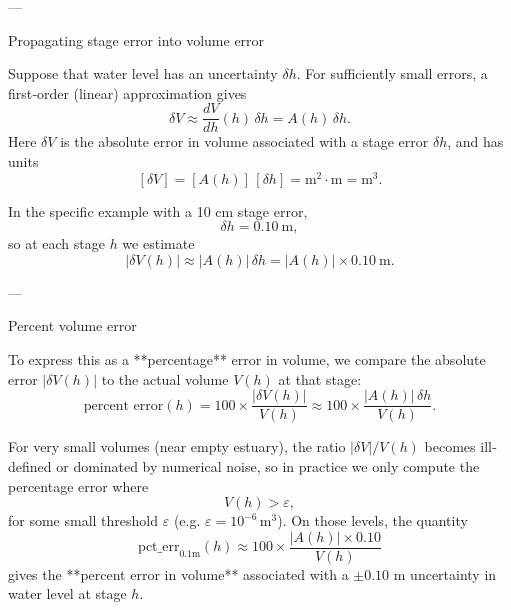 \documentclass[preprint,12pt,authoryear]{elsarticle}
\begin{document}
---

 Propagating stage error into volume error

Suppose that water level has an uncertainty \(\delta h\). For sufficiently small
errors, a first‐order (linear) approximation gives
\[
\delta V \approx \frac{dV}{dh}(h)\,\delta h = A(h)\,\delta h.
\]
Here \(\delta V\) is the absolute error in volume associated with a stage error
\(\delta h\), and has units
\[
[\delta V] = [A(h)]\,[\delta h]
           = \text{m}^2 \cdot \text{m}
           = \text{m}^3.
\]

In the specific example with a 10 cm stage error,
\[
\delta h = 0.10~\text{m},
\]
so at each stage \(h\) we estimate
\[
|\delta V(h)| \approx |A(h)| \,\delta h
                  = |A(h)| \times 0.10~\text{m}.
\]

---

 Percent volume error

To express this as a **percentage** error in volume, we compare the absolute
error \(|\delta V(h)|\) to the actual volume \(V(h)\) at that stage:
\[
\text{percent error}(h)
= 100 \times \frac{|\delta V(h)|}{V(h)}
\approx 100 \times \frac{|A(h)|\,\delta h}{V(h)}.
\]

For very small volumes (near empty estuary), the ratio
\(|\delta V| / V(h)\) becomes ill‐defined or dominated by numerical noise,
so in practice we only compute the percentage error where
\[
V(h) > \varepsilon,
\]
for some small threshold \(\varepsilon\) (e.g. \(\varepsilon = 10^{-6}\,\text{m}^3\)).
On those levels, the quantity
\[
\text{pct\_err}_{0.1\text{m}}(h)
\approx 100 \times \frac{|A(h)| \times 0.10}{V(h)}
\]
gives the **percent error in volume** associated with a \(\pm 0.10\) m uncertainty
in water level at stage \(h\).

  
 
\end{document}

